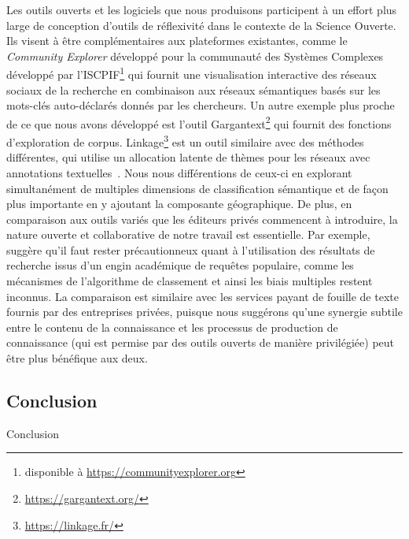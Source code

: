 {Les outils ouverts et les logiciels que nous produisons participent à un effort plus large de conception d'outils de réflexivité dans le contexte de la Science Ouverte. Ils visent à être complémentaires aux plateformes existantes, comme le \textit{Community Explorer} développé pour la communauté des Systèmes Complexes développé par l'ISCPIF\footnote{disponible à \url{https://communityexplorer.org}} qui fournit une visualisation interactive des réseaux sociaux de la recherche en combinaison aux réseaux sémantiques basés sur les mots-clés auto-déclarés donnés par les chercheurs. Un autre exemple plus proche de ce que nous avons développé est l'outil Gargantext\footnote{\url{https://gargantext.org/}} qui fournit des fonctions d'exploration de corpus. Linkage\footnote{\url{https://linkage.fr/}} est un outil similaire avec des méthodes différentes, qui utilise un allocation latente de thèmes pour les réseaux avec annotations textuelles~\citep{bouveyron2016stochastic}. Nous nous différentions de ceux-ci en explorant simultanément de multiples dimensions de classification sémantique et de façon plus importante en y ajoutant la composante géographique. De plus, en comparaison aux outils variés que les éditeurs privés commencent à introduire, la nature ouverte et collaborative de notre travail est essentielle. Par exemple, \cite{bohannon2014google} suggère qu'il faut rester précautionneux quant à l'utilisation des résultats de recherche issus d'un engin académique de requêtes populaire, comme les mécanismes de l'algorithme de classement et ainsi les biais multiples restent inconnus. La comparaison est similaire avec les services payant de fouille de texte fournis par des entreprises privées, puisque nous suggérons qu'une synergie subtile entre le contenu de la connaissance et les processus de production de connaissance (qui est permise par des outils ouverts de manière privilégiée) peut être plus bénéfique aux deux.
}




\subsection{Conclusion}{Conclusion}









